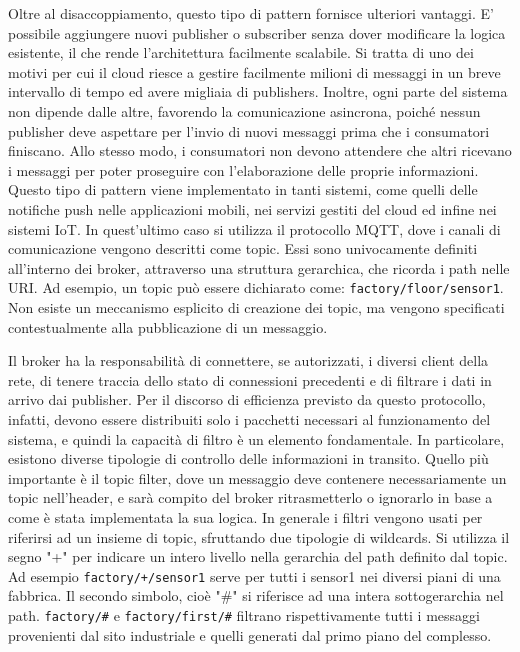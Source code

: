Oltre al disaccoppiamento, questo tipo di pattern fornisce ulteriori vantaggi\cite{a9IoT4Arch}. E' possibile aggiungere nuovi publisher o subscriber senza dover modificare la logica esistente, il che rende l'architettura facilmente scalabile. Si tratta di uno dei motivi per cui il cloud riesce a gestire facilmente milioni di messaggi in un breve intervallo di tempo ed avere migliaia di publishers. Inoltre, ogni parte del sistema non dipende dalle altre, favorendo la comunicazione asincrona, poiché nessun publisher deve aspettare per l'invio di nuovi messaggi prima che i consumatori finiscano. Allo stesso modo, i consumatori non devono attendere che altri ricevano i messaggi per poter proseguire con l'elaborazione delle proprie informazioni. Questo tipo di pattern viene implementato in tanti sistemi, come quelli delle notifiche push nelle applicazioni mobili, nei servizi gestiti del cloud ed infine nei sistemi IoT. In quest'ultimo caso si utilizza il protocollo MQTT, dove i canali di comunicazione vengono descritti come topic. Essi sono univocamente definiti all'interno dei broker, attraverso una struttura gerarchica, che ricorda i path nelle URI. Ad esempio, un topic può essere dichiarato come: \texttt{factory/floor/sensor1}. Non esiste un meccanismo esplicito di creazione dei topic, ma vengono specificati contestualmente alla pubblicazione di un messaggio.

Il broker ha la responsabilità di connettere, se autorizzati, i diversi client della rete, di tenere traccia dello stato di connessioni precedenti e di filtrare i dati in arrivo dai publisher. Per il discorso di efficienza previsto da questo protocollo, infatti, devono essere distribuiti solo i pacchetti necessari al funzionamento del sistema, e quindi la capacità di filtro è un elemento fondamentale. In particolare, esistono diverse tipologie di controllo delle informazioni in transito. Quello più importante è il topic filter, dove un messaggio deve contenere necessariamente un topic nell'header, e sarà compito del broker ritrasmetterlo o ignorarlo in base a come è stata implementata la sua logica. In generale i filtri vengono usati per riferirsi ad un insieme di topic, sfruttando due tipologie di wildcards. Si utilizza il segno "+" per indicare un intero livello nella gerarchia del path definito dal topic. Ad esempio \texttt{factory/+/sensor1} serve per tutti i sensor1 nei diversi piani di una fabbrica. Il secondo simbolo, cioè "\#" si riferisce ad una intera sottogerarchia nel path. \texttt{factory/\#} e \texttt{factory/first/\#} filtrano rispettivamente tutti i messaggi provenienti dal sito industriale e quelli generati dal primo piano del complesso. 

